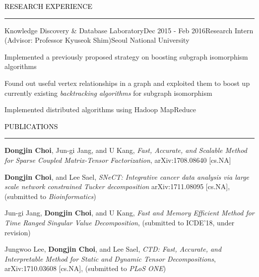 \documentclass{resume} %
\renewenvironment{rSection}[1]{
	\sectionskip
	\textcolor{Black}{\MakeUppercase{#1}}
	\sectionlineskip
	\hrule
	\begin{list}{}{
			\setlength{\leftmargin}{1.5em}
		}
		\item[]
	}{
	\end{list}
}
\begin{document}
\begin{rSection}{Research Experience}
\begin{rSubsection}{Knowledge Discovery \& Database Laboratory}{Dec 2015 - Feb 2016}{Research Intern (Advisor: Professor Kyuseok Shim)}{Seoul National University}
	\item Implemented a previously proposed strategy on boosting subgraph isomorphism algorithms
	\item Found out useful vertex relationships in a graph and exploited them to boost up currently existing \textit{backtracking algorithms} for subgraph isomorphism
	\item Implemented distributed algorithms using Hadoop MapReduce
	\vspace{1.3cm}
\end{rSubsection}

\end{rSection}



\begin{rSection}{Publications}
\begin{rSubsection}{}{}{}{}
	\vspace*{-2.5mm}
	\item \textbf{Dongjin Choi}, Jun-gi Jang, and U Kang, \textit{Fast, Accurate, and Scalable Method for Sparse Coupled Matrix-Tensor Factorization}, arXiv:1708.08640 [cs.NA]
	
	\item \textbf{Dongjin Choi}, and Lee Sael, \textit{SNeCT: Integrative cancer data analysis via large scale network constrained Tucker decomposition} arXiv:1711.08095 [cs.NA], (submitted to \textit{Bioinformatics})
	
	\item Jun-gi Jang, \textbf{Dongjin Choi}, and U Kang, \textit{Fast and Memory Efficient Method for Time Ranged Singular Value Decomposition}, (submitted to ICDE'18, under revision)
	
	\item Jungwoo Lee, \textbf{Dongjin Choi}, and Lee Sael, \textit{CTD: Fast, Accurate, and Interpretable Method for Static and Dynamic Tensor Decompositions}, arXiv:1710.03608 [cs.NA], (submitted to \textit{PLoS ONE}) 
\end{rSubsection}

\end{rSection}
\vspace{-3mm}
\end{document}
